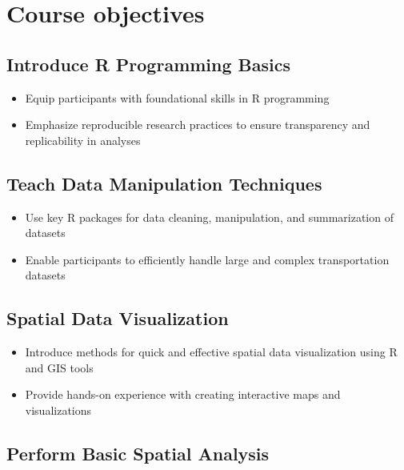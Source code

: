 \documentclass[
  letterpaper,
  DIV=11,
  numbers=noendperiod]{scrreprt}
\begin{document}
\section{Course objectives}\label{course-objectives}

\subsection*{Introduce R Programming
Basics}\label{introduce-r-programming-basics}

\begin{itemize}
\item
  Equip participants with foundational skills in R programming
\item
  Emphasize reproducible research practices to ensure transparency and
  replicability in analyses
\end{itemize}

\subsection*{Teach Data Manipulation
Techniques}\label{teach-data-manipulation-techniques}

\begin{itemize}
\item
  Use key R packages for data cleaning, manipulation, and summarization
  of datasets
\item
  Enable participants to efficiently handle large and complex
  transportation datasets
\end{itemize}

\subsection*{Spatial Data
Visualization}\label{spatial-data-visualization}

\begin{itemize}
\item
  Introduce methods for quick and effective spatial data visualization
  using R and GIS tools
\item
  Provide hands-on experience with creating interactive maps and
  visualizations
\end{itemize}

\subsection*{Perform Basic Spatial
Analysis}\label{perform-basic-spatial-analysis}
\end{document}

